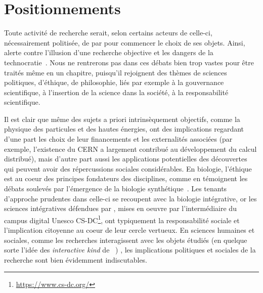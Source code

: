 



\chapter{Positionnements}


\label{ch:positioning} %



\bigskip


Toute activité de recherche serait, selon certains acteurs de celle-ci, nécessairement politisée, de par pour commencer le choix de ses objets. Ainsi,  alerte contre l'illusion d'une recherche objective et les dangers de la technocratie~\cite{ripoll2017jig}. Nous ne rentrerons pas dans ces débats bien trop vastes pour être traités même en un chapitre, puisqu'il rejoignent des thèmes de sciences politiques, d'éthique, de philosophie, liés par exemple à la gouvernance scientifique, à l'insertion de la science dans la société, à la responsabilité scientifique.


 Il est clair que même des sujets a priori intrinsèquement objectifs, comme la physique des particules et des hautes énergies, ont des implications regardant d'une part les choix de leur financements et les externalités associées (par exemple, l'existence du CERN a largement contribué au développement du calcul distribué), mais d'autre part aussi les applications potentielles des découvertes qui peuvent avoir des répercussions sociales considérables. En biologie, l'éthique est au coeur des principes fondateurs des disciplines, comme en témoignent les débats soulevés par l'émergence de la biologie synthétique~\cite{gutmann2011ethics}. Les tenants d'approche prudentes dans celle-ci se recoupent avec la biologie intégrative, or les sciences intégratives défendues par , mises en oeuvre par l'intermédiaire du campus digital Unesco CS-DC\footnote{\url{https://www.cs-dc.org/}}, ont typiquement la responsabilité sociale et l'implication citoyenne au coeur de leur cercle vertueux. En sciences humaines et sociales, comme les recherches interagissent avec les objets étudiés (en quelque sorte l'idée des \emph{interactive kind} de ~\cite{hacking1999social})%
 , les implications politiques et sociales de la recherche sont bien évidemment indiscutables.
 
